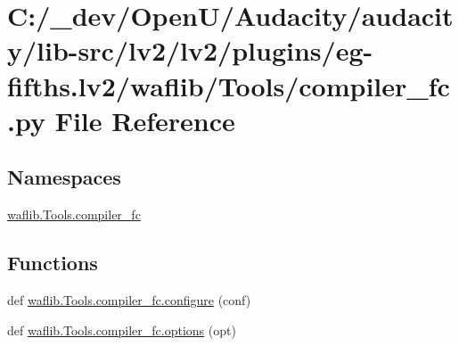 \hypertarget{lv2_2plugins_2eg-fifths_8lv2_2waflib_2_tools_2compiler__fc_8py}{}\section{C\+:/\+\_\+dev/\+Open\+U/\+Audacity/audacity/lib-\/src/lv2/lv2/plugins/eg-\/fifths.lv2/waflib/\+Tools/compiler\+\_\+fc.py File Reference}
\label{lv2_2plugins_2eg-fifths_8lv2_2waflib_2_tools_2compiler__fc_8py}
\subsection*{Namespaces}
\begin{DoxyCompactItemize}
\item 
 \hyperlink{namespacewaflib_1_1_tools_1_1compiler__fc}{waflib.\+Tools.\+compiler\+\_\+fc}
\end{DoxyCompactItemize}
\subsection*{Functions}
\begin{DoxyCompactItemize}
\item 
def \hyperlink{namespacewaflib_1_1_tools_1_1compiler__fc_afb0080302700edcb49f41f58f40aed12}{waflib.\+Tools.\+compiler\+\_\+fc.\+configure} (conf)
\item 
def \hyperlink{namespacewaflib_1_1_tools_1_1compiler__fc_ad760dedba1ba7a9aa7cfd119667484cd}{waflib.\+Tools.\+compiler\+\_\+fc.\+options} (opt)
\end{DoxyCompactItemize}
